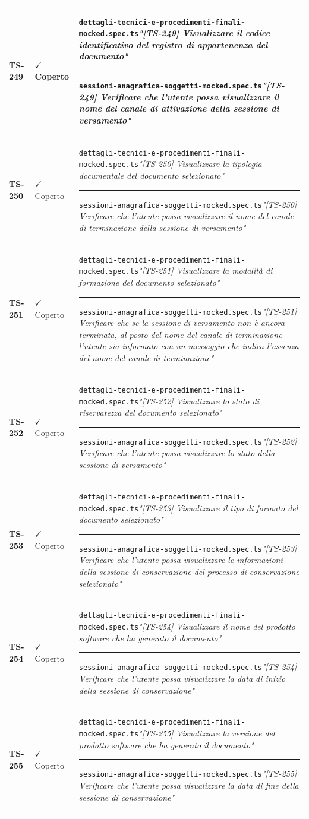 \documentclass[a4paper,12pt]{article}
\newcommand{\ok}{\textcolor{green!60!black}{$\checkmark$ Coperto}}
\newcommand{\f}[1]{\nolinkurl{#1}\newline}
\newcommand{\q}[1]{\textit{#1}}
\newcommand{\sep}{\newline \vspace{2mm} \hrule \vspace{2mm}}
\begin{document}
\begin{longtable}{|p{1.5cm}|p{3.0cm}|p{10.5cm}|}
\textbf{TS-249} & \ok & \f{dettagli-tecnici-e-procedimenti-finali-mocked.spec.ts}\q{"[TS-249] Visualizzare il codice identificativo del registro di appartenenza del documento"} \sep \f{sessioni-anagrafica-soggetti-mocked.spec.ts}\q{"[TS-249] Verificare che l'utente possa visualizzare il nome del canale di attivazione della sessione di versamento"} \\ \hline
\textbf{TS-250} & \ok & \f{dettagli-tecnici-e-procedimenti-finali-mocked.spec.ts}\q{"[TS-250] Visualizzare la tipologia documentale del documento selezionato"} \sep \f{sessioni-anagrafica-soggetti-mocked.spec.ts}\q{"[TS-250] Verificare che l'utente possa visualizzare il nome del canale di terminazione della sessione di versamento"} \\ \hline
\textbf{TS-251} & \ok & \f{dettagli-tecnici-e-procedimenti-finali-mocked.spec.ts}\q{"[TS-251] Visualizzare la modalità di formazione del documento selezionato"} \sep \f{sessioni-anagrafica-soggetti-mocked.spec.ts}\q{"[TS-251] Verificare che se la sessione di versamento non è ancora terminata, al posto del nome del canale di terminazione l'utente sia informato con un messaggio che indica l'assenza del nome del canale di terminazione"} \\ \hline
\textbf{TS-252} & \ok & \f{dettagli-tecnici-e-procedimenti-finali-mocked.spec.ts}\q{"[TS-252] Visualizzare lo stato di riservatezza del documento selezionato"} \sep \f{sessioni-anagrafica-soggetti-mocked.spec.ts}\q{"[TS-252] Verificare che l'utente possa visualizzare lo stato della sessione di versamento"} \\ \hline
\textbf{TS-253} & \ok & \f{dettagli-tecnici-e-procedimenti-finali-mocked.spec.ts}\q{"[TS-253] Visualizzare il tipo di formato del documento selezionato"} \sep \f{sessioni-anagrafica-soggetti-mocked.spec.ts}\q{"[TS-253] Verificare che l'utente possa visualizzare le informazioni della sessione di conservazione del processo di conservazione selezionato"} \\ \hline
\textbf{TS-254} & \ok & \f{dettagli-tecnici-e-procedimenti-finali-mocked.spec.ts}\q{"[TS-254] Visualizzare il nome del prodotto software che ha generato il documento"} \sep \f{sessioni-anagrafica-soggetti-mocked.spec.ts}\q{"[TS-254] Verificare che l'utente possa visualizzare la data di inizio della sessione di conservazione"} \\ \hline
\textbf{TS-255} & \ok & \f{dettagli-tecnici-e-procedimenti-finali-mocked.spec.ts}\q{"[TS-255] Visualizzare la versione del prodotto software che ha generato il documento"} \sep \f{sessioni-anagrafica-soggetti-mocked.spec.ts}\q{"[TS-255] Verificare che l'utente possa visualizzare la data di fine della sessione di conservazione"} \\ \hline

\end{longtable}
\end{document}
